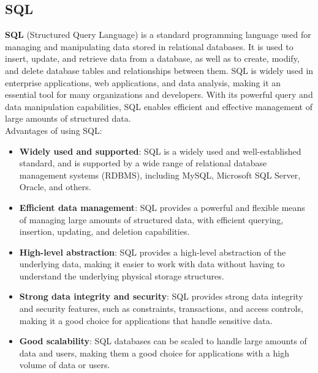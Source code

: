 \subsection{SQL}
\textbf{SQL} (Structured Query Language) is a standard programming language used for managing and manipulating data stored in relational databases. It is used to insert, update, and retrieve data from a database, as well as to create, modify, and delete database tables and relationships between them. SQL is widely used in enterprise applications, web applications, and data analysis, making it an essential tool for many organizations and developers. With its powerful query and data manipulation capabilities, SQL enables efficient and effective management of large amounts of structured data.\\
Advantages of using SQL:
\begin{itemize}
    \item \textbf{Widely used and supported}: SQL is a widely used and well-established standard, and is supported by a wide range of relational database management systems (RDBMS), including MySQL, Microsoft SQL Server, Oracle, and others.

     \item \textbf{Efficient data management}: SQL provides a powerful and flexible means of managing large amounts of structured data, with efficient querying, insertion, updating, and deletion capabilities.

     \item \textbf{High-level abstraction}: SQL provides a high-level abstraction of the underlying data, making it easier to work with data without having to understand the underlying physical storage structures.

     \item \textbf{Strong data integrity and security}: SQL provides strong data integrity and security features, such as constraints, transactions, and access controls, making it a good choice for applications that handle sensitive data.

     \item \textbf{Good scalability}: SQL databases can be scaled to handle large amounts of data and users, making them a good choice for applications with a high volume of data or users.
\end{itemize}

